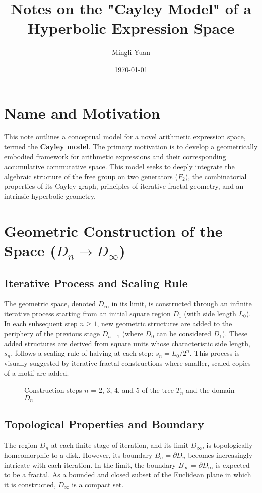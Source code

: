 \documentclass[12pt, a4paper]{article}
\title{Notes on the "Cayley Model" of a Hyperbolic Expression Space}
\author{Mingli Yuan}
\date{\today}
\begin{document}
\maketitle

\section{Name and Motivation}
This note outlines a conceptual model for a novel arithmetic expression space, termed the \textbf{Cayley model}. The primary motivation is to develop a geometrically embodied framework for arithmetic expressions and their corresponding accumulative commutative space. This model seeks to deeply integrate the algebraic structure of the free group on two generators ($F_2$), the combinatorial properties of its Cayley graph, principles of iterative fractal geometry, and an intrinsic hyperbolic geometry.

\section{Geometric Construction of the Space ($D_n \to D_\infty$)}

\subsection{Iterative Process and Scaling Rule}
The geometric space, denoted $D_\infty$ in its limit, is constructed through an infinite iterative process starting from an initial square region $D_1$ (with side length $L_0$). In each subsequent step $n \ge 1$, new geometric structures are added to the periphery of the previous stage $D_{n-1}$ (where $D_0$ can be considered $D_1$). These added structures are derived from square units whose characteristic side length, $s_n$, follows a scaling rule of halving at each step: $s_n = L_0/2^n$. This process is visually suggested by iterative fractal constructions where smaller, scaled copies of a motif are added.

\begin{figure}
    \centering
    \caption{Construction steps $n$ = 2, 3, 4, and 5 of the tree $T_n$ and the domain $D_n$}
\end{figure}

\subsection{Topological Properties and Boundary}
The region $D_n$ at each finite stage of iteration, and its limit $D_\infty$, is topologically homeomorphic to a disk. However, its boundary $B_n = \partial D_n$ becomes increasingly intricate with each iteration. In the limit, the boundary $B_\infty = \partial D_\infty$ is expected to be a fractal. As a bounded and closed subset of the Euclidean plane in which it is constructed, $D_\infty$ is a compact set.
\end{document}
